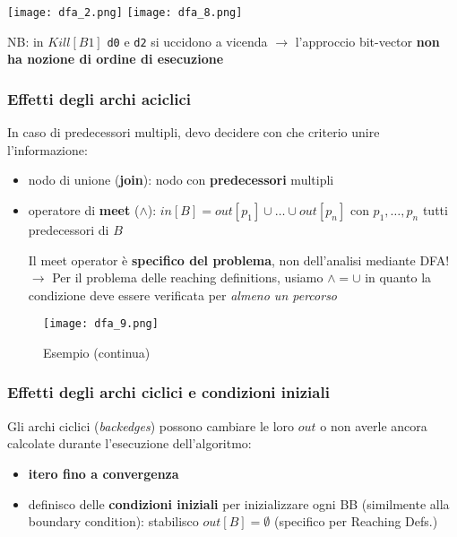 \vspace{-1em}
\begin{example}
  \begin{center}
    \texttt{[image: dfa\_2.png]}\hfill
    \texttt{[image: dfa\_8.png]}
  \end{center}
  \begin{emphasize}
    NB: in $Kill[B1]$ \lstinline|d0| e \lstinline|d2| si uccidono a vicenda $\rightarrow$ l'approccio bit-vector \textbf{non ha nozione di ordine di esecuzione}
  \end{emphasize}
\end{example}

\vspace{-1em}
\subsubsection{Effetti degli archi aciclici}

In caso di predecessori multipli, devo decidere con che criterio unire l'informazione:
\begin{itemize}
  \item nodo di unione (\textbf{join}): nodo con \textbf{predecessori} multipli
  \item operatore di \textbf{meet} ($\wedge$): $in[B] = out[p_1] \cup \ldots \cup out[p_n]$ con $p_1,\ldots,p_n$ tutti predecessori di $B$
  \begin{emphasize}
    Il meet operator \`e \textbf{specifico del problema}, non dell'analisi mediante DFA!
    \noindent $\rightarrow$ Per il problema delle reaching definitions, usiamo $\wedge = \cup$ in quanto la condizione deve essere verificata per \textit{almeno un percorso}
  \end{emphasize}
\end{itemize}

\begin{figure}[h]
  \centering
  \texttt{[image: dfa\_9.png]}
  \caption{Esempio (continua)}
\end{figure}

\subsubsection{Effetti degli archi ciclici e condizioni iniziali}

Gli archi ciclici (\textit{backedges}) possono cambiare le loro $out$ o non averle ancora calcolate durante l'esecuzione dell'algoritmo:
\begin{itemize}
  \item \textbf{itero fino a convergenza}
  \item definisco delle \textbf{condizioni iniziali} per inizializzare ogni BB (similmente alla boundary condition): stabilisco $out[B] = \emptyset$ (specifico per Reaching Defs.)
\end{itemize}


